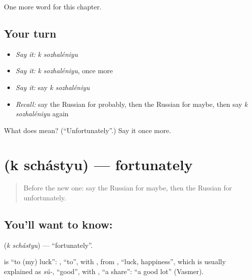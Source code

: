 \begin{grammarlens}[title={What you've built}]
One more word for this chapter.
\end{grammarlens}

\subsection*{Your turn}
\begin{itemize}
\raggedright
  \item \emph{Say it:} \emph{k sozhaléniyu}
  \item \emph{Say it:} \emph{k sozhaléniyu}, once more
  \item \emph{Say it:} say \emph{k sozhaléniyu}
  \item \emph{Recall:} say the Russian for probably, then the Russian for maybe, then say \emph{k sozhaléniyu} again
\end{itemize}

\begin{tcolorbox}[breakable,colback=teal!4,colframe=teal!35!black,title={Before you move on}]
What does   mean? (\textquotedblleft{}Unfortunately\textquotedblright{}.) Say it once more.
\end{tcolorbox}
\section[\texorpdfstring{\ru{к} \ru{счастью} (k schástyu)}{к счастью (k schástyu)}]{  (k schástyu) — fortunately}

\label{lesson:RU-C215-k-schastyu}



\begin{quote}
Before the new one: say the Russian for maybe, then the Russian for unfortunately.
\end{quote}

\subsection*{You'll want to know:  }
\textbf{ } (\emph{k schástyu}) — \textquotedblleft{}fortunately\textquotedblright{}.

\begin{cousinweb}
\textbf{ } is \textquotedblleft{}to (my) luck\textquotedblright{}: \emph{}, \textquotedblleft{}to\textquotedblright{}, with \emph{}, from \emph{}, \textquotedblleft{}luck, happiness\textquotedblright{}, which is usually explained as \emph{sŭ-}, \textquotedblleft{}good\textquotedblright{}, with \emph{}, \textquotedblleft{}a share\textquotedblright{}: \textquotedblleft{}a good lot\textquotedblright{} (Vasmer).
\end{cousinweb}

